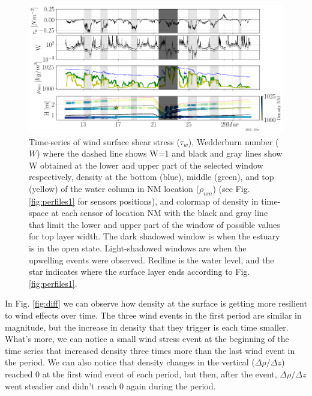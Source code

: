 \documentclass[tesis.tex]{subfiles}
\begin{document}
\begin{figure}[h!]
    \centering
    \includegraphics[width=\textwidth]{Imagenes/wedd.png}
    \caption{Time-series of wind surface shear stress ($\tau_w$), Wedderburn number ($W$) where the dashed line shows W=1 and black and gray lines show W obtained at the lower and upper part of the selected window respectively, density at the bottom (blue), middle (green), and top (yellow) of the water column in NM location ($\rho_{nm}$) (see Fig. \ref{fig:perfiles1} for sensors positions), and colormap of density in time-space at each sensor of location NM with the black and gray line that limit the lower and upper part of the window of possible values for top layer width. The dark shadowed window is when the estuary is in the open state. Light-shadowed windows are when the upwelling events were observed. Redline is the water level, and the star indicates where the surface layer ends according to Fig. \ref{fig:perfiles1}.}
    \label{fig:wedd}
\end{figure}

In Fig. \ref{fig:diff} we can observe how density at the surface is getting more resilient to wind effects over time. The three wind events in the first period are similar in magnitude, but the increase in density that they trigger is each time smaller. What's more, we can notice a small wind stress event at the beginning of the time series that increased density three times more than the last wind event in the period. We can also notice that density changes in the vertical ($\Delta \rho/\Delta z$) reached 0 at the first wind event of each period, but then, after the event, $\Delta \rho/\Delta z$ went steadier and didn't reach 0 again during the period.\\
\end{document}
